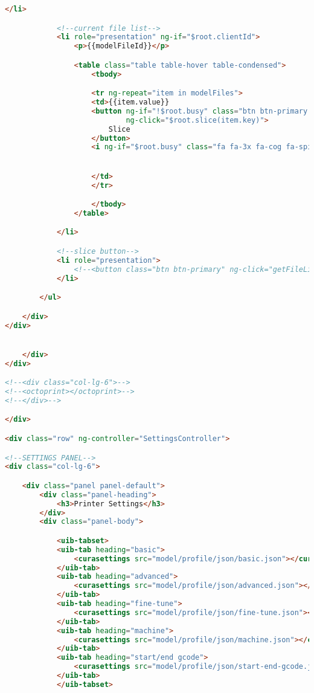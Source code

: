 \begin{lstlisting}[language=HTML, label={lst:index}, caption=As this is a single page web application this is the only HTML file. It contains all of the libraries needed to run all subsequent sections.]
            </li>

            <!--current file list-->
            <li role="presentation" ng-if="$root.clientId">
                <p>{{modelFileId}}</p>

                <table class="table table-hover table-condensed">
                    <tbody>

                    <tr ng-repeat="item in modelFiles">
                    <td>{{item.value}}
                    <button ng-if="!$root.busy" class="btn btn-primary btn-sm pull-right"
                            ng-click="$root.slice(item.key)">
                        Slice
                    </button>
                    <i ng-if="$root.busy" class="fa fa-3x fa-cog fa-spin pull-right"></i>


                    </td>
                    </tr>

                    </tbody>
                </table>

            </li>

            <!--slice button-->
            <li role="presentation">
                <!--<button class="btn btn-primary" ng-click="getFileList()">Refresh file list</button>-->
            </li>

        </ul>

    </div>
</div>


    </div>
</div>

<!--<div class="col-lg-6">-->
<!--<octoprint></octoprint>-->
<!--</div>-->

</div>

<div class="row" ng-controller="SettingsController">

<!--SETTINGS PANEL-->
<div class="col-lg-6">

    <div class="panel panel-default">
        <div class="panel-heading">
            <h3>Printer Settings</h3>
        </div>
        <div class="panel-body">

            <uib-tabset>
            <uib-tab heading="basic">
                <curasettings src="model/profile/json/basic.json"></curasettings>
            </uib-tab>
            <uib-tab heading="advanced">
                <curasettings src="model/profile/json/advanced.json"></curasettings>
            </uib-tab>
            <uib-tab heading="fine-tune">
                <curasettings src="model/profile/json/fine-tune.json"></curasettings>
            </uib-tab>
            <uib-tab heading="machine">
                <curasettings src="model/profile/json/machine.json"></curasettings>
            </uib-tab>
            <uib-tab heading="start/end gcode">
                <curasettings src="model/profile/json/start-end-gcode.json"></curasettings>
            </uib-tab>
            </uib-tabset>


\end{lstlisting}
